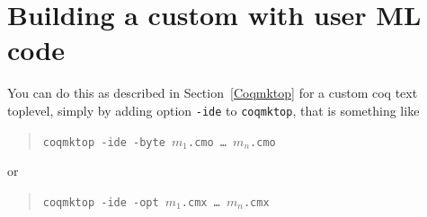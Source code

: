 \section{Building a custom \CoqIDE{} with user \textsc{ML} code}

You can do this as described in Section~\ref{Coqmktop} for a
custom coq text toplevel, simply by adding 
option \verb|-ide| to \verb|coqmktop|, that is something like
\begin{quote}
\texttt{coqmktop -ide -byte $m_1$.cmo \ldots{} $m_n$.cmo}
\end{quote}
or 
\begin{quote}
\texttt{coqmktop -ide -opt $m_1$.cmx \ldots{} $m_n$.cmx}
\end{quote}

    


